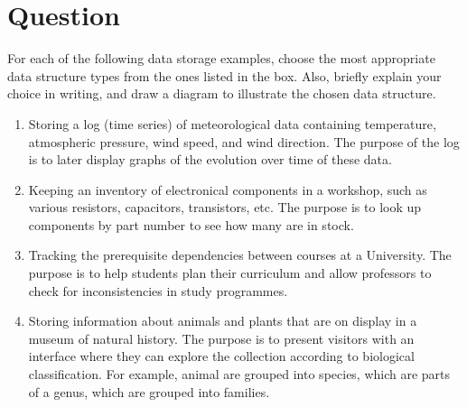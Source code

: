 \documentclass[a4paper]{article}
\newcounter{question}
\newcommand{\question}{\refstepcounter{question}\section*{Question~\thequestion}}
\renewcommand*\thequestion{\arabic{question}}
\begin{document}
\pagebreak
\pagestyle{plain}
\thispagestyle{plain}
\setcounter{page}{1}



\question

For each of the following data storage examples, choose the most appropriate data structure types from the ones listed in the box.
Also, briefly explain your choice in writing, and draw a diagram to illustrate the chosen data structure.

\begin{center}
\end{center}


\begin{enumerate}
\item
  Storing a log (time series) of meteorological data containing temperature, atmospheric pressure, wind speed, and wind direction.
  The purpose of the log is to later display graphs of the evolution over time of these data.
\item
  Keeping an inventory of electronical components in a workshop, such as various resistors, capacitors, transistors, etc.
  The purpose is to look up components by part number to see how many are in stock.
\item
  Tracking the prerequisite dependencies between courses at a University.
  The purpose is to help students plan their curriculum and allow professors to check for inconsistencies in study programmes.
\item
  Storing information about animals and plants that are on display in a museum of natural history.
  The purpose is to present visitors with an interface where they can explore the collection according to biological classification.
  For example, animal are grouped into species, which are parts of a genus, which are grouped into families.
\end{enumerate}
\end{document}
